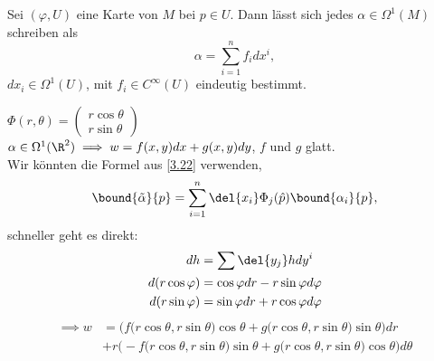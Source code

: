 \begin{lem}
	Sei $ (\varphi,U) $ eine Karte von $M$ bei $p \in U$. Dann lässt sich jedes $ \alpha \in \Omega^1(M) $ schreiben als
	\[ \alpha = \sum_{i=1}^n f_i d x^i, \]
	$dx_i \in \Omega^1(U)$, mit $f_i \in C^\infty(U)$ eindeutig bestimmt.
\end{lem}

\begin{exmp*}
	$ \Phi(r,\theta) = \begin{pmatrix}
		r\cos\theta\\ r \sin\theta
	\end{pmatrix} $\\
	$\alpha \in \Omega^1(\R^2) \implies w = f(x,y)dx + g(x,y)dy$, $f$ und $g$ glatt.\\
	Wir könnten die Formel aus \ref{3.22} verwenden,
	\[ \bound{\tilde{\alpha}}{p} = \sum_{i=1}^n \del{x_i} \Phi_j (\hat{p}) \bound{\alpha_i}{p}, \]
	schneller geht es direkt:
	\begin{align*}
		dh &= \sum \del{y_j} h dy^i\\
		d(r\cos\varphi) &= \cos\varphi dr - r \sin\varphi d\varphi\\
		d(r\sin\varphi) &= \sin\varphi dr + r \cos\varphi d\varphi
	\end{align*}
	\begin{align*}
		\implies w &= \Big(f \big(r\cos\theta,r\sin\theta \big)\cos\theta + g \big(r\cos\theta,r\sin\theta \big)\sin\theta\Big) dr\\
		&+ r\Big(-f \big(r\cos\theta,r\sin\theta \big)\sin\theta + g \big(r\cos\theta,r\sin\theta \big)\cos\theta\Big) d\theta
	\end{align*} 
\end{exmp*}
